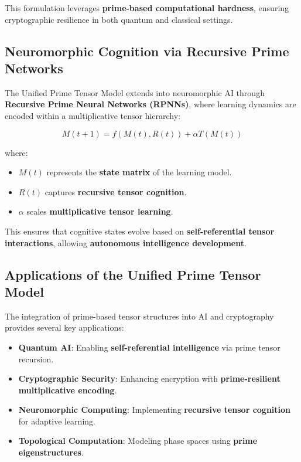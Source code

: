 \documentclass{article}
\theoremstyle{plain}
\theoremstyle{plain}
\theoremstyle{definition}
\theoremstyle{remark}
\begin{document}
This formulation leverages \textbf{prime-based computational hardness}, ensuring cryptographic resilience in both quantum and classical settings.

\subsection{Neuromorphic Cognition via Recursive Prime Networks}

The Unified Prime Tensor Model extends into neuromorphic AI through \textbf{Recursive Prime Neural Networks (RPNNs)}, where learning dynamics are encoded within a multiplicative tensor hierarchy:

\begin{equation}
M(t+1) = f(M(t), R(t)) + \alpha T(M(t))
\end{equation}

where:
\begin{itemize}
    \item $M(t)$ represents the \textbf{state matrix} of the learning model.
    \item $R(t)$ captures \textbf{recursive tensor cognition}.
    \item $\alpha$ scales \textbf{multiplicative tensor learning}.
\end{itemize}

This ensures that cognitive states evolve based on \textbf{self-referential tensor interactions}, allowing \textbf{autonomous intelligence development}.

\subsection{Applications of the Unified Prime Tensor Model}

The integration of prime-based tensor structures into AI and cryptography provides several key applications:
\begin{itemize}
    \item \textbf{Quantum AI}: Enabling \textbf{self-referential intelligence} via prime tensor recursion.
    \item \textbf{Cryptographic Security}: Enhancing encryption with \textbf{prime-resilient multiplicative encoding}.
    \item \textbf{Neuromorphic Computing}: Implementing \textbf{recursive tensor cognition} for adaptive learning.
    \item \textbf{Topological Computation}: Modeling phase spaces using \textbf{prime eigenstructures}.
\end{itemize}
\end{document}
